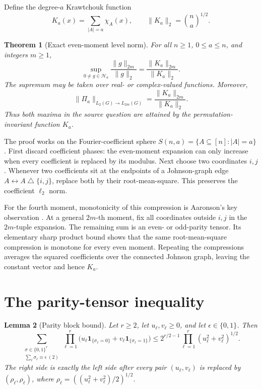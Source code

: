 \documentclass[11pt]{article}
\newtheorem{theorem}{Theorem}
\newtheorem{lemma}[theorem]{Lemma}
\newcommand{\cH}{\mathcal H}
\begin{document}
Define the degree-$a$ Krawtchouk function
\[
 K_a(x)=\sum_{|A|=a}\chi_A(x),
 \qquad \|K_a\|_2=\binom na^{1/2}.
\]

\begin{theorem}[Exact even-moment level norm]\label{thm:main}
For all $n\geq1$, $0\leq a\leq n$, and integers $m\geq1$,
\begin{equation}\label{eq:level}
 \sup_{0\ne g\in\cH_a}\frac{\|g\|_{2m}}{\|g\|_2}
 =\frac{\|K_a\|_{2m}}{\|K_a\|_2}.
\end{equation}
The supremum may be taken over real- or complex-valued functions.  Moreover,
\begin{equation}\label{eq:projection}
 \|\Pi_a\|_{L_2(G)\to L_{2m}(G)}
 =\frac{\|K_a\|_{2m}}{\|K_a\|_2}.
\end{equation}
Thus both maxima in the source question are attained by the
permutation-invariant function $K_a$.
\end{theorem}

The proof works on the Fourier-coefficient sphere
$S(n,a)=\{A\subseteq[n]:|A|=a\}$.  First discard coefficient phases: the
even-moment expansion can only increase when every coefficient is replaced
by its modulus.  Next choose two coordinates $i,j$.  Whenever two
coefficients sit at the endpoints of a Johnson-graph edge
$A\leftrightarrow A\mathbin\triangle\{i,j\}$, replace both by their
root-mean-square.  This preserves the coefficient $\ell_2$ norm.

For the fourth moment, monotonicity of this compression is Aaronson's key
observation \cite{Aaronson}.  At a general $2m$-th moment, fix all
coordinates outside $i,j$ in the $2m$-tuple expansion.  The remaining
sum is an even- or odd-parity tensor.  Its elementary sharp product bound
shows that the same root-mean-square compression is monotone for every
even moment.  Repeating the compressions averages the squared coefficients
over the connected Johnson graph, leaving the constant vector and hence
$K_a$.

\section{The parity-tensor inequality}

\begin{lemma}[Parity block bound]\label{lem:parity}
Let $r\geq2$, let $u_\ell,v_\ell\geq0$, and let
$\epsilon\in\{0,1\}$.  Then
\begin{equation}\label{eq:parity}
 \sum_{\substack{\sigma\in\{0,1\}^r\\
                  \sum_\ell\sigma_\ell\equiv\epsilon\ (2)}}
 \prod_{\ell=1}^r
 \bigl(u_\ell\mathbf1_{\{\sigma_\ell=0\}}
      +v_\ell\mathbf1_{\{\sigma_\ell=1\}}\bigr)
 \leq
 2^{r/2-1}\prod_{\ell=1}^r(u_\ell^2+v_\ell^2)^{1/2}.
\end{equation}
The right side is exactly the left side after every pair
$(u_\ell,v_\ell)$ is replaced by
$(\rho_\ell,\rho_\ell)$, where
$\rho_\ell=((u_\ell^2+v_\ell^2)/2)^{1/2}$.
\end{lemma}
\end{document}
